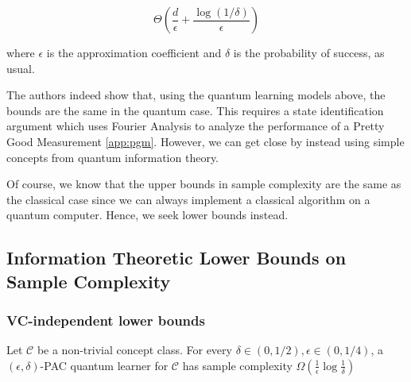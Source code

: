 \documentclass[main.tex]{subfiles}
\begin{document}
$$
\Theta(\frac{d}{\epsilon} + \frac{\log(1/\delta)}{\epsilon})
$$

where $\epsilon$ is the approximation coefficient and $\delta$ is the probability of success, as usual.
%
%

The authors indeed show that, using the quantum learning models above, the bounds are the same in the quantum case. This requires a state identification argument which uses Fourier Analysis to analyze the performance of a Pretty Good Measurement \ref{app:pgm}. However, we can get close by instead using simple concepts from quantum information theory.

Of course, we know that the upper bounds in sample complexity are the same as the classical case since we can always implement a classical algorithm on a quantum computer. Hence, we seek lower bounds instead. 

\subsection{Information Theoretic Lower Bounds on Sample Complexity}

\subsubsection{VC-independent lower bounds}

\begin{lemma}
\label{lem:vc-indep-pac}
Let $\mathcal{C}$ be a non-trivial concept class. For every $\delta \in (0,1/2), \epsilon \in (0,1/4)$, a $(\epsilon,\delta)$-PAC quantum learner for $\mathcal{C}$ has sample complexity $\Omega(\frac{1}{\epsilon}\log \frac{1}{\delta})$
\end{lemma}
\end{document}
